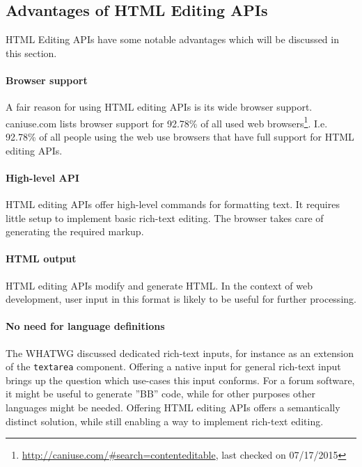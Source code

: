 \subsection{Advantages of HTML Editing APIs}

HTML Editing APIs have some notable advantages which will be discussed in this section.

\paragraph{Browser support}

A fair reason for using HTML editing APIs is its wide browser support. caniuse.com lists browser support for 92.78\% of all used web browsers\footnote{\url{http://caniuse.com/#search=contenteditable}, last checked on 07/17/2015}. I.e. 92.78\% of all people using the web use browsers that have full support for HTML editing APIs.

\paragraph{High-level API}

HTML editing APIs offer high-level commands for formatting text. It requires little setup to implement basic rich-text editing. The browser takes care of generating the required markup.

\paragraph{HTML output}

HTML editing APIs modify and generate HTML. In the context of web development, user input in this format is likely to be useful for further processing.

\paragraph{No need for language definitions}

The WHATWG discussed dedicated rich-text inputs, for instance as an extension of the \texttt{textarea} component. Offering a native input for general rich-text input brings up the question which use-cases this input conforms. For a forum software, it might be useful to generate ''BB'' code, while for other purposes other languages might be needed. Offering HTML editing APIs offers a semantically distinct solution, while still enabling a way to implement rich-text editing. %

